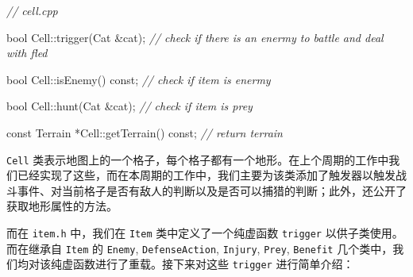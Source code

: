 \documentclass[hyperref,UTF8,a4paper]{ctexart}
\newenvironment{Shaded}{}{}
\newcommand{\AttributeTok}[1]{\textcolor[rgb]{0.49,0.56,0.16}{#1}}
\newcommand{\CommentTok}[1]{\textcolor[rgb]{0.38,0.63,0.69}{\textit{#1}}}
\newcommand{\DataTypeTok}[1]{\textcolor[rgb]{0.56,0.13,0.00}{#1}}
\newcommand{\NormalTok}[1]{#1}
\begin{document}
\begin{Shaded}
\begin{Highlighting}[]
\CommentTok{// cell.cpp}

\DataTypeTok{bool}\NormalTok{ Cell::trigger(Cat &cat);}
\CommentTok{// check if there is an enermy to battle and deal with fled}

\DataTypeTok{bool}\NormalTok{ Cell::isEnemy() }\AttributeTok{const}\NormalTok{;}
\CommentTok{// check if item is enermy}

\DataTypeTok{bool}\NormalTok{ Cell::hunt(Cat &cat);}
\CommentTok{// check if item is prey}

\AttributeTok{const}\NormalTok{ Terrain *Cell::getTerrain() }\AttributeTok{const}\NormalTok{;}
\CommentTok{// return terrain}
\end{Highlighting}
\end{Shaded}

\texttt{Cell}
类表示地图上的一个格子，每个格子都有一个地形。在上个周期的工作中我们已经实现了这些，而在本周期的工作中，我们主要为该类添加了触发器以触发战斗事件、对当前格子是否有敌人的判断以及是否可以捕猎的判断；此外，还公开了获取地形属性的方法。

而在 \texttt{item.h} 中，我们在 \texttt{Item} 类中定义了一个纯虚函数
\texttt{trigger} 以供子类使用。而在继承自 \texttt{Item} 的
\texttt{Enemy}, \texttt{DefenseAction}, \texttt{Injury}, \texttt{Prey},
\texttt{Benefit} 几个类中，我们均对该纯虚函数进行了重载。接下来对这些
\texttt{trigger} 进行简单介绍：
\end{document}
